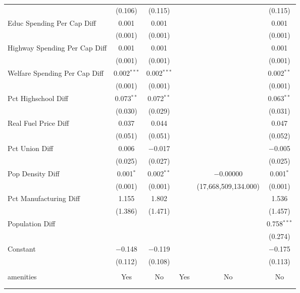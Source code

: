 \begin{table}[!htbp]
\begin{tabular}{@{\extracolsep{5pt}}lccccc}
  & (0.106) & (0.115) &  &  & (0.115) \\ 
  Educ Spending Per Cap Diff & 0.001 & 0.001 &  &  & 0.001 \\ 
  & (0.001) & (0.001) &  &  & (0.001) \\ 
  Highway Spending Per Cap Diff & 0.001 & 0.001 &  &  & 0.001 \\ 
  & (0.001) & (0.001) &  &  & (0.001) \\ 
  Welfare Spending Per Cap Diff & 0.002$^{***}$ & 0.002$^{***}$ &  &  & 0.002$^{**}$ \\ 
  & (0.001) & (0.001) &  &  & (0.001) \\ 
  Pct Highschool Diff & 0.073$^{**}$ & 0.072$^{**}$ &  &  & 0.063$^{**}$ \\ 
  & (0.030) & (0.029) &  &  & (0.031) \\ 
  Real Fuel Price Diff & 0.037 & 0.044 &  &  & 0.047 \\ 
  & (0.051) & (0.051) &  &  & (0.052) \\ 
  Pct Union Diff & 0.006 & $-$0.017 &  &  & $-$0.005 \\ 
  & (0.025) & (0.027) &  &  & (0.025) \\ 
  Pop Density Diff & 0.001$^{*}$ & 0.002$^{**}$ &  & $-$0.00000 & 0.001$^{*}$ \\ 
  & (0.001) & (0.001) &  & (17,668,509,134.000) & (0.001) \\ 
  Pct Manufacturing Diff & 1.155 & 1.802 &  &  & 1.536 \\ 
  & (1.386) & (1.471) &  &  & (1.457) \\ 
  Population Diff &  &  &  &  & 0.758$^{***}$ \\ 
  &  &  &  &  & (0.274) \\ 
  Constant & $-$0.148 & $-$0.119 &  &  & $-$0.175 \\ 
  & (0.112) & (0.108) &  &  & (0.113) \\ 
 \hline \\[-1.8ex] 
amenities & Yes & No & Yes & No & No \\ 
\hline \\[-1.8ex] 
\hline 
\hline \\[-1.8ex] 
\end{tabular} 
\end{table} 
